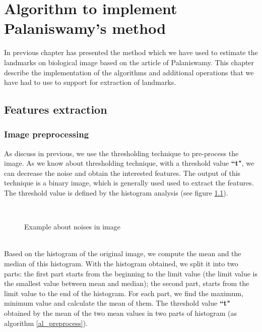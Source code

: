\chapter{Algorithm to implement Palaniswamy's method}
In previous chapter has presented the method which we have used to estimate the landmarks on biological image based on the article of Palaniswamy. This chapter describe the implementation of the algorithms and additional operations that we have had to use to support for extraction of landmarks.
\section{Features extraction}
\subsection{Image preprocessing}
As discuss in previous, we use the thresholding technique to pre-process the image. As we know about thresholding technique, with a threshold value \textbf{``t"}, we can decrease the noise and obtain the interested features. The output of this technique is a binary image, which is generally used used to extract the features. The threshold value is defined by the histogram analysis (see figure \ref{fig:31}).
\begin{figure}[h!]
\centering
{}~~
\caption{Example about noises in image}
\label{fig:31}
\end{figure}~\\
Based on the histogram of the original image, we compute the mean and the median of this histogram. With the histogram obtained, we split it into two parts: the first part starts from the beginning to the limit value (the limit value is the smallest value between mean and median); the second part, starts from the limit value to the end of the histogram. For each part, we find the maximum, minimum value and calculate the mean of them. The threshold value \textbf{``t"} obtained by the mean of the two mean values in two parts of histogram (as algorithm \ref{al_preprocess}).\\
